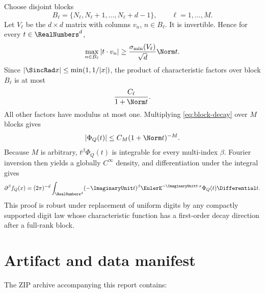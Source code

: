 \documentclass[11pt,a4paper]{article}
\theoremstyle{definition}
\theoremstyle{remark}
\begin{document}
Choose disjoint blocks
\[
  B_\ell=\{N_\ell,N_\ell+1,\ldots,N_\ell+d-1\},
  \qquad \ell=1,\ldots,M.
\]
Let $V_\ell$ be the $d\times d$ matrix with columns $v_n$, $n\in B_\ell$.  It is invertible.  Hence for every $t\in\RealNumbers^d$,
\begin{equation}
  \max_{n\in B_\ell}|t\cdot v_n|
   \ge\frac{\sigma_{\min}(V_\ell)}{\sqrt d}\Norm t.
  \label{eq:block-projection}
\end{equation}
Since $|\SincRad x|\le\min(1,1/|x|)$, the product of characteristic factors over block $B_\ell$ is at most
\begin{equation}
  \frac{C_\ell}{1+\Norm t}.
  \label{eq:block-decay}
\end{equation}
All other factors have modulus at most one.  Multiplying \eqref{eq:block-decay} over $M$ blocks gives
\begin{equation}
  |\Phi_Q(t)|\le C_M(1+\Norm t)^{-M}.
  \label{eq:rapid-decay}
\end{equation}
Because $M$ is arbitrary, $t^\beta\Phi_Q(t)$ is integrable for every multi-index $\beta$.  Fourier inversion then yields a globally $C^\infty$ density, and differentiation under the integral gives
\begin{equation}
  \partial^\beta f_Q(x)
   =(2\pi)^{-d}\int_{\RealNumbers^d}
      (-\ImaginaryUnit t)^\beta\EulerE^{-\ImaginaryUnit t\cdot x}\Phi_Q(t)\Differential t.
  \label{eq:density-derivative-Fourier}
\end{equation}
This proof is robust under replacement of uniform digits by any compactly supported digit law whose characteristic function has a first-order decay direction after a full-rank block.

\section{Artifact and data manifest}
\label{app:manifest}

The ZIP archive accompanying this report contains:
\end{document}
